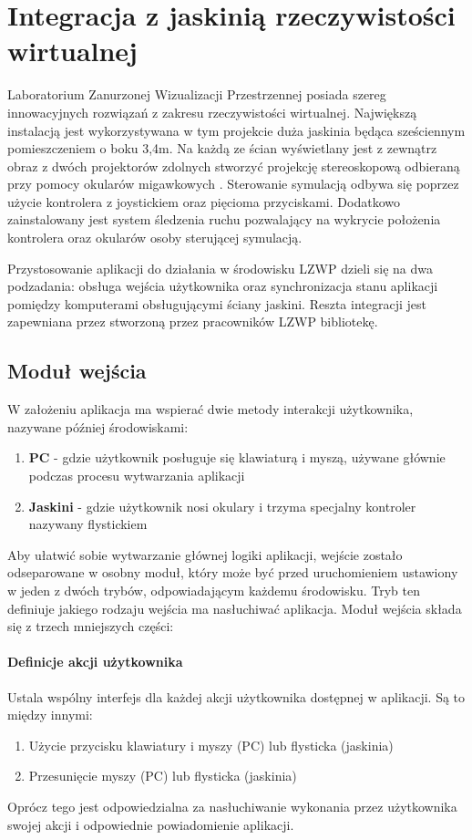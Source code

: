 \section{Integracja z jaskinią rzeczywistości wirtualnej}
Laboratorium Zanurzonej Wizualizacji Przestrzennej \cite{LZWP_article} posiada szereg innowacyjnych rozwiązań z zakresu rzeczywistości wirtualnej. Największą instalacją jest wykorzystywana w tym projekcie duża jaskinia będąca sześciennym pomieszczeniem o boku 3,4m. Na każdą ze ścian wyświetlany jest z zewnątrz obraz z dwóch projektorów zdolnych stworzyć projekcję stereoskopową odbieraną przy pomocy okularów migawkowych \cite{IntegraAV}. Sterowanie symulacją odbywa się poprzez użycie kontrolera z joystickiem oraz pięcioma przyciskami. Dodatkowo zainstalowany jest system śledzenia ruchu pozwalający na wykrycie położenia kontrolera oraz okularów osoby sterującej symulacją.

Przystosowanie aplikacji do działania w środowisku LZWP dzieli się na dwa podzadania: obsługa wejścia użytkownika oraz synchronizacja stanu aplikacji pomiędzy komputerami obsługującymi ściany jaskini. Reszta integracji jest zapewniana przez stworzoną przez pracowników LZWP bibliotekę.

\subsection{Moduł wejścia}
W założeniu aplikacja ma wspierać dwie metody interakcji użytkownika, nazywane później środowiskami:
\begin{enumerate}[label=\textbullet]
	\item \textbf{PC} - gdzie użytkownik posługuje się klawiaturą i myszą, używane głównie podczas procesu wytwarzania aplikacji
	\item \textbf{Jaskini} - gdzie użytkownik nosi okulary i trzyma specjalny kontroler nazywany flystickiem
\end{enumerate}
Aby ułatwić sobie wytwarzanie głównej logiki aplikacji, wejście zostało odseparowane w osobny moduł, który może być przed uruchomieniem ustawiony w jeden z dwóch trybów, odpowiadającym każdemu środowisku. Tryb ten definiuje jakiego rodzaju wejścia ma nasłuchiwać aplikacja. Moduł wejścia składa się z trzech mniejszych części:
\paragraph{Definicje akcji użytkownika}
Ustala wspólny interfejs dla każdej akcji użytkownika dostępnej w aplikacji. Są to między innymi: 
\begin{enumerate}[label=\textbullet]
	\item Użycie przycisku klawiatury i myszy (PC) lub flysticka (jaskinia)
	\item Przesunięcie myszy (PC) lub flysticka (jaskinia)
\end{enumerate}
Oprócz tego jest odpowiedzialna za nasłuchiwanie wykonania przez użytkownika swojej akcji i odpowiednie powiadomienie aplikacji.

